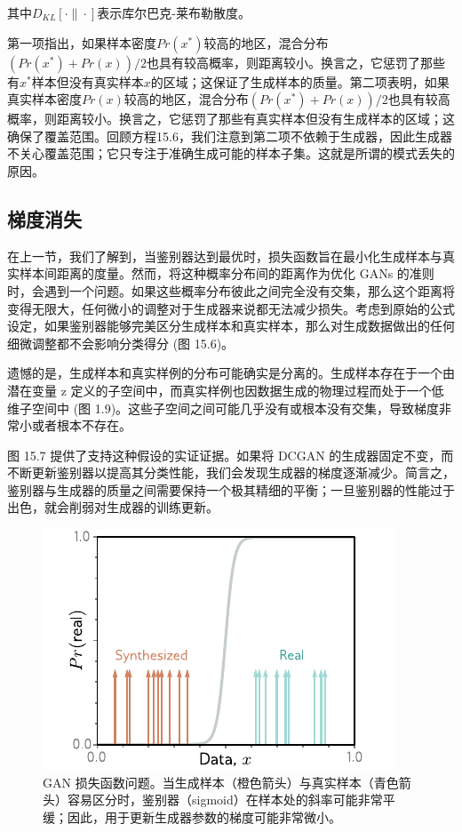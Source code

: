 \documentclass[lang=cn,newtx,10pt,scheme=chinese]{elegantbook}
\begin{document}
其中\(D_{KL}[\cdot\|\cdot]\)表示库尔巴克-莱布勒散度。

第一项指出，如果样本密度\(Pr(x^*)\)较高的地区，混合分布\((Pr(x^*) + Pr(x))/2\)也具有较高概率，则距离较小。换言之，它惩罚了那些有\(x^*\)样本但没有真实样本\(x\)的区域；这保证了生成样本的质量。第二项表明，如果真实样本密度\(Pr(x)\)较高的地区，混合分布\((Pr(x^*) + Pr(x))/2\)也具有较高概率，则距离较小。换言之，它惩罚了那些有真实样本但没有生成样本的区域；这确保了覆盖范围。回顾方程15.6，我们注意到第二项不依赖于生成器，因此生成器不关心覆盖范围；它只专注于准确生成可能的样本子集。这就是所谓的模式丢失的原因。

\subsection{梯度消失}
在上一节，我们了解到，当鉴别器达到最优时，损失函数旨在最小化生成样本与真实样本间距离的度量。然而，将这种概率分布间的距离作为优化 GANs 的准则时，会遇到一个问题。如果这些概率分布彼此之间完全没有交集，那么这个距离将变得无限大，任何微小的调整对于生成器来说都无法减少损失。考虑到原始的公式设定，如果鉴别器能够完美区分生成样本和真实样本，那么对生成数据做出的任何细微调整都不会影响分类得分 (图 15.6)。

遗憾的是，生成样本和真实样例的分布可能确实是分离的。生成样本存在于一个由潜在变量 z 定义的子空间中，而真实样例也因数据生成的物理过程而处于一个低维子空间中 (图 1.9)。这些子空间之间可能几乎没有或根本没有交集，导致梯度非常小或者根本不存在。

图 15.7 提供了支持这种假设的实证证据。如果将 DCGAN 的生成器固定不变，而不断更新鉴别器以提高其分类性能，我们会发现生成器的梯度逐渐减少。简言之，鉴别器与生成器的质量之间需要保持一个极其精细的平衡；一旦鉴别器的性能过于出色，就会削弱对生成器的训练更新。

\begin{figure}[ht!]
\centering
\includegraphics[width=0.7\linewidth]{PDFFigures/UDLChap15PDF/GanGaussMotivationProb.pdf}
\caption{GAN 损失函数问题。当生成样本（橙色箭头）与真实样本（青色箭头）容易区分时，鉴别器（sigmoid）在样本处的斜率可能非常平缓；因此，用于更新生成器参数的梯度可能非常微小。}
\end{figure}
\end{document}
